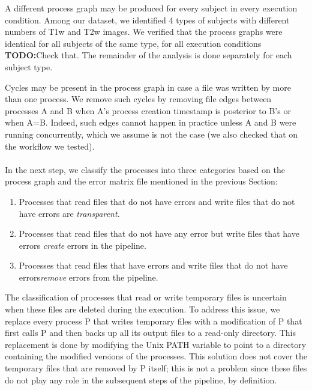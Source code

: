 \documentclass{article}
\newcommand{\todo}[1]{\color{red}\textbf{TODO:}#1\color{black}}
\begin{document}
\medskip

A different process graph may be produced for every subject in every
execution condition. Among our dataset, we identified 4 types of
subjects with different numbers of T1w and T2w images. We verified
that the process graphs were identical for all subjects of the same
type, for all execution conditions \todo{Check that}. The remainder of
the analysis is done separately for each subject type.

Cycles may be present in the process graph in case a file was written 
by more than one process. We remove such cycles by removing file edges 
between processes A and B when A's process creation timestamp is 
posterior to B's or when A=B. Indeed, such edges cannot happen in 
practice unless A and B were running concurrently, which we assume is 
not the case (we also checked that on the workflow we tested). 

\paragraph{} In the next step, we classify the processes into three 
categories based on the process graph and the error matrix file 
mentioned in the previous Section:
\begin{enumerate}
\item Processes 
that read files that do not have errors and write files that do not 
have errors are \emph{transparent}.
\item Processes that read files 
that do not have any error but write files that have errors 
\emph{create} errors in the pipeline.
\item Processes that read files 
that have errors and write files that do not have errors\emph{remove} 
errors from the pipeline.
\end{enumerate}

The classification of processes that read or write temporary files is 
uncertain when these files are deleted during the execution. To address 
this issue, we replace every process P that writes temporary files with 
a modification of P that first calls P and then backs up all its output 
files to a read-only directory. This replacement is done by modifying 
the Unix PATH variable to point to a directory containing the modified
versions of the processes. This solution does not cover the temporary files
that are removed by P itself; this is not a problem since these files do not
play any role in the subsequent steps of the pipeline, by definition.
\end{document}
